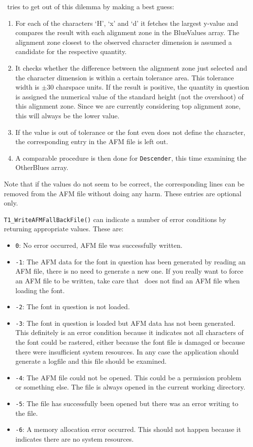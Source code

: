 \tonelib\ tries to get out of this dilemma by making a best guess:
\begin{enumerate}
\item For each of the characters `H', `x' and `d' it fetches the
  largest y-value and compares the result with each alignment zone in
  the BlueValues array. The alignment zone closest to the observed
  character dimension is assumed a candidate for the respective
  quantity. 
\item It checks whether the difference between the alignment zone just
  selected and the character dimension is within a certain tolerance
  area. This tolerance width is $\pm 30$ charspace units. If the
  result is positive, the quantity in question is assigned the
  numerical value of the standard height (not the overshoot) of this
  alignment zone. Since we are currently considering top
  alignment zone, this will always be the lower value. 
\item If the value is out of tolerance or the font even does not
  define the character, the corresponding entry in the AFM file is left
  out.
\item A comparable procedure is then done for \verb+Descender+, this
  time examining the OtherBlues array.
\end{enumerate}
Note that if the values do not seem to be correct, the corresponding
lines can be removed from the AFM file without doing any harm. These
entries are optional only.

\verb+T1_WriteAFMFallBackFile()+ can indicate  a number of error
conditions by returning appropriate values. These are:
\begin{itemize}
\item \verb+0+: No error occurred, AFM file was successfully written.
\item \verb+-1+: The AFM data for the font in question has been
  generated by reading an AFM file, there is no need to generate a new
  one. If you really want to force an AFM file to be written, take
  care that \tonelib\ does not find an AFM file when loading the
  font. 
\item \verb+-2+: The font in question is not loaded.
\item \verb+-3+: The font in question is loaded but AFM data has not
  been generated. This definitely is an error condition because it
  indicates not all characters of the font could be rastered, either
  because the font file is damaged or because there were 
  insufficient system resources. In any case the application should
  generate a logfile and this file should be examined.
\item \verb+-4+: The AFM file could not be opened. This could be a
  permission problem or something else. The file is always opened in
  the current working directory.
\item \verb+-5+: The file has successfully been opened but there was
  an error writing to the file.
\item \verb+-6+: A memory allocation error occurred. This should not
  happen because it indicates there are no system resources. 
\end{itemize}


